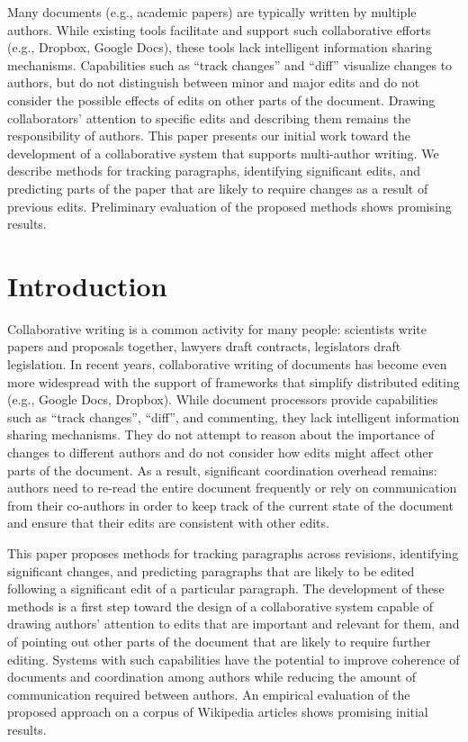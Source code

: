 Many documents (e.g., academic papers) are typically written by multiple
authors. While existing tools facilitate and support such collaborative
efforts (e.g., Dropbox, Google Docs), these tools lack intelligent
information sharing mechanisms. Capabilities such as ``track changes''
and ``diff'' visualize changes to authors, but do not distinguish
between minor and major edits and do not consider the possible effects
of edits on other parts of the document. Drawing collaborators'
attention to specific edits and describing them remains the
responsibility of authors. This paper presents our initial work toward
the development of a collaborative system that supports multi-author
writing. We describe methods for tracking paragraphs, identifying
significant edits, and predicting parts of the paper that are likely to
require changes as a result of previous edits. Preliminary evaluation of
the proposed methods shows promising results.

\section{Introduction}\label{introduction}

Collaborative writing is a common activity for many people: scientists
write papers and proposals together, lawyers draft contracts,
legislators draft legislation. In recent years, collaborative writing of
documents has become even more widespread with the support of frameworks
that simplify distributed editing (e.g., Google Docs, Dropbox). While
document processors provide capabilities such as ``track changes'',
``diff'', and commenting, they lack intelligent information sharing
mechanisms. They do not attempt to reason about the importance of
changes to different authors and do not consider how edits might affect
other parts of the document. As a result, significant coordination
overhead remains: authors need to re-read the entire document frequently
or rely on communication from their co-authors in order to keep track of
the current state of the document and ensure that their edits are
consistent with other edits.

This paper proposes methods for tracking paragraphs across revisions,
identifying significant changes, and predicting paragraphs that are
likely to be edited following a significant edit of a particular
paragraph. The development of these methods is a first step toward the
design of a collaborative system capable of drawing authors' attention
to edits that are important and relevant for them, and of pointing out
other parts of the document that are likely to require further editing.
Systems with such capabilities have the potential to improve coherence
of documents and coordination among authors while reducing the amount of
communication required between authors. An empirical evaluation of the
proposed approach on a corpus of Wikipedia articles shows promising
initial results.

